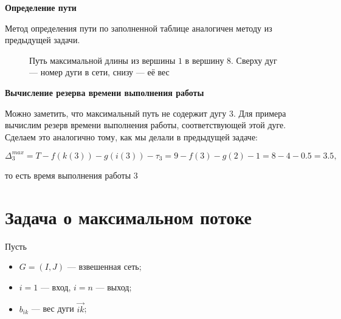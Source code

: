 \bigskip

\textbf{Определение пути}

Метод определения пути по заполненной таблице аналогичен методу из предыдущей задачи.

\begin{figure}[H]
	\centering	
	\caption{Путь максимальной длины из вершины $1$ в вершину $8$. Сверху дуг --- номер дуги в сети, снизу --- её вес}
\end{figure}

\bigskip

\textbf{Вычисление резерва времени выполнения работы}

Можно заметить, что максимальный путь не содержит дугу $3$. Для примера вычислим резерв времени выполнения работы, соответствующей этой дуге. Сделаем это аналогично тому, как мы делали в предыдущей задаче:

\[
\Delta^{max}_3 = T - f(k(3)) - g(i(3)) - \tau_3 = 9 - f(3) - g(2) - 1 = 8 - 4 - 0.5 = 3.5,
\]

то есть время выполнения работы $3$

\section{Задача о максимальном потоке}


Пусть
\begin{itemize}[nosep]
	\item $G = (I, J)$ --- взвешенная сеть;
	
	\item $i = 1$ --- вход, $i = n$ --- выход;
	
	\item $b_{ik}$ --- вес дуги $\vec{ik}$;
\end{itemize}

